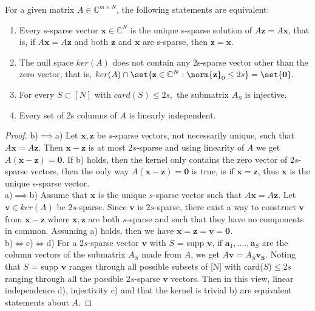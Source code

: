 \begin{tcolorbox}[colback=yellow,colframe=white]
\begin{theorem}
For a given matrix $A \in \mathbb{C}^{m \times N}$, the following statements are equivalent: 
\begin{enumerate}[label=\alph*)]
	\item Every s-sparse vector ${\mathbf{x} \in \mathbb{C}^N}$ is the unique s-sparse solution of $A \mathbf{z} = A \mathbf{x}$, that is, if $A \mathbf{x} = A \mathbf{z}$ and both 				$\mathbf{z}$ and $\mathbf{x}$ are s-sparse, then $\mathbf{z} = \mathbf{x}$.
 	\item The null space $ker(A)$ does not contain any 2s-sparse vector other than the zero vector, that is, $ker(A) \cap 	\set{\mathbf{z} \in \mathbb{C}^N : \norm{\mathbf{z}}_0 \leq 2s} = \set{\mathbf{0}}.$
	\item For every $S \subset [N]$ with $card(S) \leq 2s,$ the submatrix $A_S$ is injective.
	\item Every set of 2s columns of $A$ is linearly independent.
\end{enumerate}


\end{theorem}
\end{tcolorbox}

\begin{proof}
b)$\implies$a) Let $\mathbf{x,z}$ be $s$-sparse vectors, not necessarily unique, such that $A\mathbf{x} =A\mathbf{z}$. Then $\mathbf{x-z}$ is at most 2$s$-sparse and using linearity of $A$ we get $A(\mathbf{x-z})=\mathbf{0}$. If b) holds, then the kernel only contains the zero vector of 2$s$-sparse vectors, then the only way $A(\mathbf{x-z})=\mathbf{0}$ is true, is if $\mathbf{x=z}$, thus $\mathbf{x}$ is the unique s-sparse vector.
\\ a)$\implies$b) Assume that $\mathbf{x}$ is the unique $s$-sparse vector such that $A\mathbf{x} =A\mathbf{z}$. Let $\mathbf{v} \in ker(A)$ be $2s$-sparse. Since $\mathbf{v}$ is $2s$-sparse, there exist a way to construct $\mathbf{v}$ from $\mathbf{x-z}$ where $\mathbf{x, z}$ are both $s$-sparse and such that they have no components in common. Assuming a) holds, then we have $\mathbf{x}=\mathbf{z}=\mathbf{v}=\mathbf{0}$.
\\ b)$\iff$c)$\iff$d) For a $2s$-sparse vector $\mathbf{v}$ with $S$ = supp $\mathbf{v}$, if $\mathbf{a}_1,....,\mathbf{a}_S$ are the column vectors of the submatrix $A_S$ made from $A$, we get $A\mathbf{v}=A_S\mathbf{v_S}$. Noting that $S$ = supp $\mathbf{v}$ ranges through all possible subsets of [N] with card($S$)$\leq 2s$ ranging through all the possible $2s$-sparse $\mathbf{v}$ vectors. Then in this view, linear independence d), injectivity c) and that the kernel is trivial b) are equivalent statements about $A$.

\end{proof}



